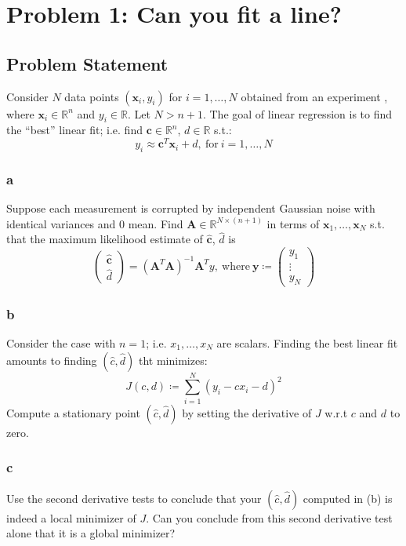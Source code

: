\documentclass[11pt]{report}
\theoremstyle{definition}
\begin{document}
\section*{Problem 1: Can you fit a line?}
\subsection*{Problem Statement}
Consider $N$ data points $(\mathbf{x}_i, y_i)$ for $i=1,\ldots,N$ obtained from
an experiment , where $\mathbf{x}_i\in\mathbb{R}^n$ and $y_i\in\mathbb{R}$. Let
$N>n+1$. The goal of linear regression is to find the ``best'' linear fit; i.e.
find $\mathbf{c}\in\mathbb{R}^n$, $d\in\mathbb{R}$ s.t.:
\[y_i\approx \mathbf{c}^T\mathbf{x}_i + d,\ \textrm{for}\ i=1,\ldots,N\]

\subsubsection*{a}
Suppose each measurement is corrupted by independent Gaussian noise with
identical variances and 0 mean. Find $\mathbf{A}\in\mathbb{R}^{N\times(n+1)}$ in
terms of $\mathbf{x}_1,\ldots,\mathbf{x}_N$ s.t. that the maximum likelihood
estimate of $\hat{\mathbf{c}}$, $\hat{d}$ is
\[
	\begin{pmatrix}
		\hat{\mathbf{c}} \\
		\hat{d}
	\end{pmatrix}
	=
	\left(\mathbf{A}^T\mathbf{A}\right)^{-1}\mathbf{A}^Ty,\
	\textrm{where}\ \mathbf{y}\coloneqq
	\begin{pmatrix}
		y_1    \\
		\vdots \\
		y_N
	\end{pmatrix}
\]

\subsubsection*{b}
Consider the case with $n=1$; i.e. $x_1,\ldots,x_N$ are scalars. Finding the best linear fit amounts to finding
$(\hat{c}, \hat{d})$ tht minimizes:
\[ J(c,d) \coloneqq \sum_{i=1}^{N}(y_i-cx_i-d)^2 \]
Compute a stationary point $(\hat{c},\hat{d})$ by setting the derivative of $J$ w.r.t $c$ and $d$ to zero.

\subsubsection*{c}
Use the second derivative tests to conclude that your $(\hat{c}, \hat{d})$ computed in (b) is indeed a
local minimizer of $J$. Can you conclude from this second derivative test alone that it is a global minimizer?
\end{document}
